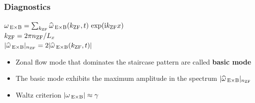 \documentclass[compress,aspectratio=1610,noflama]{beamer}
\begin{document}
	\begin{frame}
		\frametitle{Diagnostics}
		
		\begin{center}
			 $\omega_{\mathrm{\:E \times B}} = \sum_{k_\mathrm{ZF}} \widehat{\omega}_{\mathrm{\:E \times B}}(k_\mathrm{ZF},t) \, \exp(\mathrm{i} k_\mathrm{ZF} x)$ \\[0.5cm]
			\onslide<2-> $k_\mathrm{ZF} = 2\pi n_\mathrm{ZF}/L_x$ \\[0.5cm]
			\onslide<2-> $|\widehat{\omega}_{\mathrm{\:E \times B}}|_{n_\mathrm{ZF}} = 2 |\widehat{\omega}_{\mathrm{\:E \times B}}(k_\mathrm{ZF},t)|$ \\[0.5cm]
			\begin{itemize}
				\item <3-> Zonal flow mode that dominates the staircase pattern are called \textbf{basic mode} 
				\item <4-> The basic mode exhibits the maximum amplitude in the spectrum $|\widehat{\omega}_{\mathrm{\:E \times B}}|_{n_\mathrm{ZF}}$
				\item <5-> Waltz criterion $|\omega_{\mathrm{\:E \times B}}|\approx\gamma$
			\end{itemize}
		\end{center}
	\end{frame}
\end{document}
